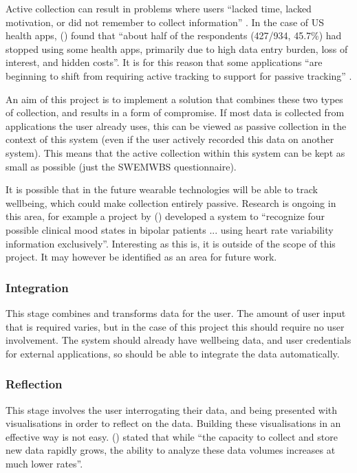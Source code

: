 \documentclass[11pt,openright,a4paper]{report}
\begin{document}
Active collection can result in problems where users \enquote{lacked time, lacked motivation, or did not remember to collect information} \parencite{li2010stage}. In the case of US health apps, \citeauthor{krebs2015health} (\citeyear{krebs2015health}) found that \enquote{about half of the respondents (427/934, 45.7\%) had stopped using some health apps, primarily due to high data entry burden, loss of interest, and hidden costs}. It is for this reason that some applications \enquote{are beginning to shift from requiring active tracking to
support for passive tracking} \parencite{rooksby2014personal}.

An aim of this project is to implement a solution that combines these two types of collection, and results in a form of compromise. If most data is collected from applications the user already uses, this can be viewed as passive collection in the context of this system (even if the user actively recorded this data on another system). This means that the active collection within this system can be kept as small as possible (just the SWEMWBS questionnaire).

It is possible that in the future wearable technologies will be able to track wellbeing, which could make collection entirely passive. Research is ongoing in this area, for example a project by \citeauthor{valenza2014wearable} (\citeyear{valenza2014wearable}) developed a system to \enquote{recognize four possible clinical mood states in bipolar patients ... using heart rate variability information exclusively}. Interesting as this is, it is outside of the scope of this project. It may however be identified as an area for future work.

\subsubsection{Integration}
This stage combines and transforms data for the user. The amount of user input that is required varies, but in the case of this project this should require no user involvement. The system should already have wellbeing data, and user credentials for external applications, so should be able to integrate the data automatically.

\subsubsection{Reflection}
This stage involves the user interrogating their data, and being presented with visualisations in order to reflect on the data. Building these visualisations in an effective way is not easy. \citeauthor{keim2008visual} (\citeyear{keim2008visual}) stated that while \enquote{the capacity to collect and store new data rapidly grows, the ability to analyze these data volumes increases at much lower rates}.
\end{document}
